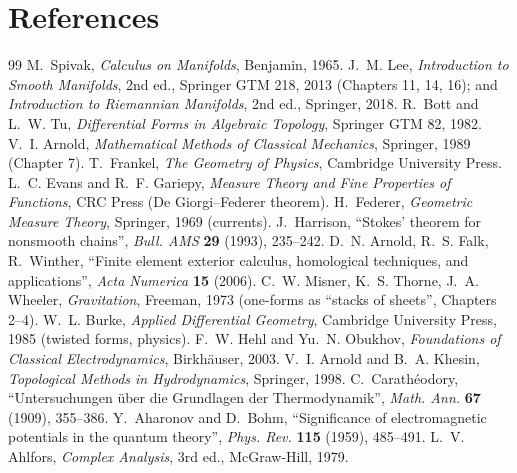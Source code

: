 \section*{References}\label{sec:refs}

\begin{thebibliography}{99}\small
{} M.~Spivak, \emph{Calculus on Manifolds}, Benjamin, 1965.
 J.~M. Lee, \emph{Introduction to Smooth Manifolds}, 2nd ed., Springer GTM 218, 2013 (Chapters 11, 14, 16); and \emph{Introduction to Riemannian Manifolds}, 2nd ed., Springer, 2018.
 R.~Bott and L.~W. Tu, \emph{Differential Forms in Algebraic Topology}, Springer GTM 82, 1982.
 V.~I. Arnold, \emph{Mathematical Methods of Classical Mechanics}, Springer, 1989 (Chapter 7).
 T.~Frankel, \emph{The Geometry of Physics}, Cambridge University Press.
 L.~C. Evans and R.~F. Gariepy, \emph{Measure Theory and Fine Properties of Functions}, CRC Press (De Giorgi--Federer theorem).
 H.~Federer, \emph{Geometric Measure Theory}, Springer, 1969 (currents).
 J.~Harrison, ``Stokes' theorem for nonsmooth chains'', \emph{Bull. AMS} \textbf{29} (1993), 235--242.
 D.~N. Arnold, R.~S. Falk, R.~Winther, ``Finite element exterior calculus, homological techniques, and applications'', \emph{Acta Numerica} \textbf{15} (2006).
 C.~W. Misner, K.~S. Thorne, J.~A. Wheeler, \emph{Gravitation}, Freeman, 1973 (one-forms as ``stacks of sheets'', Chapters 2--4).
 W.~L. Burke, \emph{Applied Differential Geometry}, Cambridge University Press, 1985 (twisted forms, physics).
 F.~W. Hehl and Yu.~N. Obukhov, \emph{Foundations of Classical Electrodynamics}, Birkh\"auser, 2003.
 V.~I. Arnold and B.~A. Khesin, \emph{Topological Methods in Hydrodynamics}, Springer, 1998.
 C.~Carath\'eodory, ``Untersuchungen \"uber die Grundlagen der Thermodynamik'', \emph{Math. Ann.} \textbf{67} (1909), 355--386.
 Y.~Aharonov and D.~Bohm, ``Significance of electromagnetic potentials in the quantum theory'', \emph{Phys. Rev.} \textbf{115} (1959), 485--491.
 L.~V. Ahlfors, \emph{Complex Analysis}, 3rd ed., McGraw-Hill, 1979.

\end{thebibliography}
